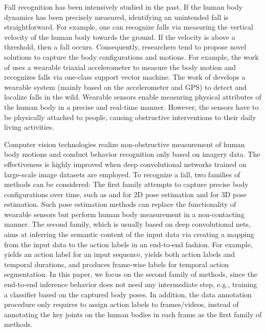 \documentclass[runningheads]{llncs}
\begin{document}
Fall recognition has been intensively studied in the past. If the human body dynamics has been precisely measured, identifying an unintended fall is straightforward. For example, one can recognize falls via measuring the vertical velocity of the human body towards the ground. If the velocity is above a threshold, then a fall occurs. Consequently, researchers tend to propose novel solutions to capture the body configurations and motions. For example, the work of \cite{zhang2006fall} uses a wearable triaxial accelerometer to measure the body motion and recognizes falls via one-class support vector machine. The work of \cite{wu2015development} develops a wearable system (mainly based on the accelerometer and GPS) to detect and localize falls in the wild. Wearable sensors enable measuring physical attributes of the human body in a precise and real-time manner. However, the sensors have to be physically attached to people, causing obstructive interventions to their daily living activities. 


Computer vision technologies realize non-obstructive measurement of human body motions and conduct behavior recognition only based on imagery data. The effectiveness is highly improved when deep convolutional networks trained on large-scale image datasets are employed. To recognize a fall, two families of methods can be considered: The first family attempts to capture precise body configurations over time, such as \cite{cao2017realtime} and \cite{insafutdinov2017cvpr} for 2D pose estimation and \cite{guler2018densepose} for 3D pose estimation. Such pose estimation methods can replace the functionality of wearable sensors but perform human body measurement in a non-contacting manner. The second family, which is usually based on deep convolutional nets, aims at inferring the semantic content of the input data via creating a mapping from the input data to the action labels in an end-to-end fashion. For example, \cite{simonyan2014two} yields an action label for an input sequence, \cite{neverova2014multi} yields both action labels and temporal durations, and \cite{Lea_2017_CVPR} produces frame-wise labels for temporal action segmentation. In this paper, we focus on the second family of methods, since the end-to-end inference behavior does not need any intermediate step, e.g., training a classifier based on the captured body poses. In addition, the data annotation procedure only requires to assign action labels to frames/videos, instead of annotating the key joints on the human bodies in each frame as the first family of methods.
\end{document}
